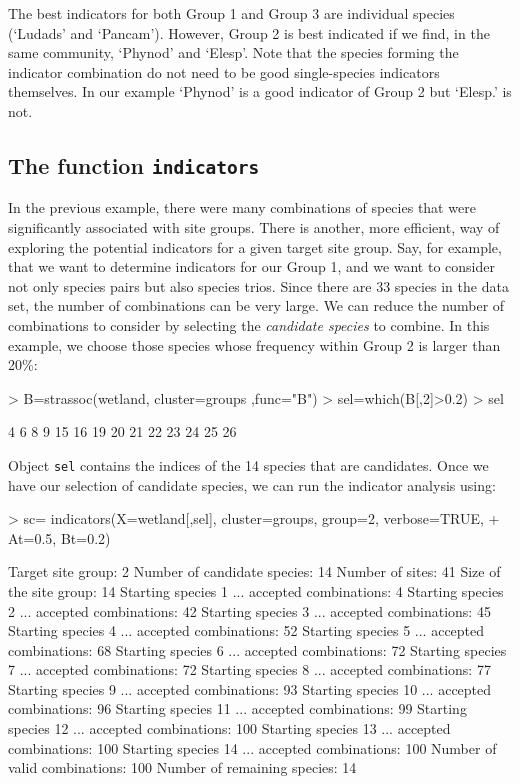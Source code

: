 \documentclass[11pt,a4paper]{article}
\begin{document}
The best indicators for both Group 1 and Group 3 are individual species (`Ludads' and `Pancam'). However, Group 2 is best indicated if we find, in the same community, `Phynod' and `Elesp'. Note that the species forming the indicator combination do not need to be good single-species indicators themselves. In our example `Phynod' is a good indicator of Group 2 but `Elesp.' is not.

\subsection{The function \texttt{indicators}}
In the previous example, there were many combinations of species that were significantly associated with site groups. There is another, more efficient, way of exploring the potential indicators for a given target site group. Say, for example, that we want to determine indicators for our Group 1, and we want to consider not only species pairs but also species trios. Since there are 33 species in the data set, the number of combinations can be very large. We can reduce the number of combinations to consider by selecting the \emph{candidate species} to combine. In this example, we choose those species whose frequency within Group 2 is larger than 20\%:
\begin{Schunk}
\begin{Sinput}
> B=strassoc(wetland, cluster=groups ,func="B") 
> sel=which(B[,2]>0.2) 
> sel
\end{Sinput}
\begin{Soutput}
 [1]  4  6  8  9 15 16 19 20 21 22 23 24 25 26
\end{Soutput}
\end{Schunk}
Object \texttt{sel} contains the indices of the 14 species that are candidates. Once we have our selection of candidate species, we can run the indicator analysis using:
\begin{Schunk}
\begin{Sinput}
> sc= indicators(X=wetland[,sel], cluster=groups, group=2, verbose=TRUE, 
+                At=0.5, Bt=0.2)
\end{Sinput}
\begin{Soutput}
Target site group: 2
Number of candidate species: 14
Number of sites: 41 
Size of the site group: 14 
Starting species  1 ... accepted combinations: 4 
Starting species  2 ... accepted combinations: 42 
Starting species  3 ... accepted combinations: 45 
Starting species  4 ... accepted combinations: 52 
Starting species  5 ... accepted combinations: 68 
Starting species  6 ... accepted combinations: 72 
Starting species  7 ... accepted combinations: 72 
Starting species  8 ... accepted combinations: 77 
Starting species  9 ... accepted combinations: 93 
Starting species  10 ... accepted combinations: 96 
Starting species  11 ... accepted combinations: 99 
Starting species  12 ... accepted combinations: 100 
Starting species  13 ... accepted combinations: 100 
Starting species  14 ... accepted combinations: 100 
Number of valid combinations: 100
Number of remaining species: 14 
\end{Soutput}
\end{Schunk}
\end{document}
